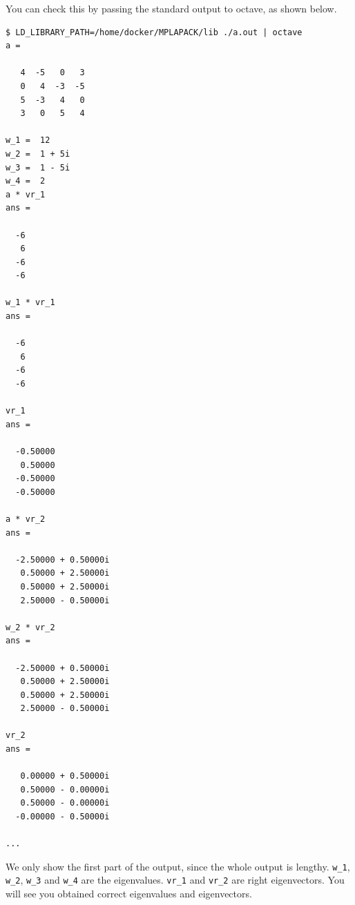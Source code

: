 \documentclass[12pt]{article}
\begin{document}
You can check this by passing the standard output to octave, as shown below.
{\footnotesize
\begin{verbatim}
$ LD_LIBRARY_PATH=/home/docker/MPLAPACK/lib ./a.out | octave
a =

   4  -5   0   3
   0   4  -3  -5
   5  -3   4   0
   3   0   5   4

w_1 =  12
w_2 =  1 + 5i
w_3 =  1 - 5i
w_4 =  2
a * vr_1
ans =

  -6
   6
  -6
  -6

w_1 * vr_1
ans =

  -6
   6
  -6
  -6

vr_1
ans =

  -0.50000
   0.50000
  -0.50000
  -0.50000

a * vr_2
ans =

  -2.50000 + 0.50000i
   0.50000 + 2.50000i
   0.50000 + 2.50000i
   2.50000 - 0.50000i

w_2 * vr_2
ans =

  -2.50000 + 0.50000i
   0.50000 + 2.50000i
   0.50000 + 2.50000i
   2.50000 - 0.50000i

vr_2
ans =

   0.00000 + 0.50000i
   0.50000 - 0.00000i
   0.50000 - 0.00000i
  -0.00000 - 0.50000i

...
\end{verbatim}
}
We only show the first part of the output, since the whole output is lengthy. 
{\tt w\_1}, {\tt w\_2}, {\tt w\_3} and {\tt w\_4} are the eigenvalues. {\tt vr\_1} and {\tt vr\_2} are right eigenvectors. You will see you obtained correct eigenvalues and eigenvectors.
\end{document}
